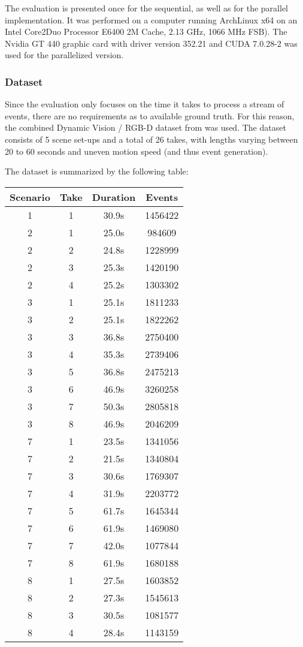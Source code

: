 The evaluation is presented once for the sequential, as well as for the parallel implementation.
It was performed on a computer running ArchLinux x64 on an Intel Core2Duo Processor E6400 2M Cache, 2.13 GHz, 1066 MHz FSB).
The Nvidia GT 440 graphic card with driver version 352.21 and CUDA 7.0.28-2 was used for the parallelized version.

\subsubsection{Dataset}
Since the evaluation only focuses on the time it takes to process a stream of events, there are no requirements as to available ground truth.
For this reason, the combined Dynamic Vision / RGB-D dataset from \cite{ebslamdataset} was used.
The dataset consists of 5 scene set-ups and a total of 26 takes, with lengths varying between 20 to 60 seconds and uneven motion speed (and thus event generation).

The dataset is summarized by the following table:\\
\begin{center}
\begin{tabular}{ | c | c | c | c | }
	\hline		
	Scenario & Take & Duration & Events\\
	\hline	
	\hline	
	1 & 1 & 30.9s & 1456422\\
	2 & 1 & 25.0s & 984609\\
	2 & 2 & 24.8s & 1228999\\
	2 & 3 & 25.3s & 1420190\\
	2 & 4 & 25.2s & 1303302\\
	3 & 1 & 25.1s & 1811233\\
	3 & 2 & 25.1s & 1822262\\
	3 & 3 & 36.8s & 2750400\\
	3 & 4 & 35.3s & 2739406\\
	3 & 5 & 36.8s & 2475213\\
	3 & 6 & 46.9s & 3260258\\
	3 & 7 & 50.3s & 2805818\\
	3 & 8 & 46.9s & 2046209\\
	7 & 1 & 23.5s & 1341056\\
	7 & 2 & 21.5s & 1340804\\
	7 & 3 & 30.6s & 1769307\\
	7 & 4 & 31.9s & 2203772\\
	7 & 5 & 61.7s & 1645344\\
	7 & 6 & 61.9s & 1469080\\
	7 & 7 & 42.0s & 1077844\\
	7 & 8 & 61.9s & 1680188\\
	8 & 1 & 27.5s & 1603852\\
	8 & 2 & 27.3s & 1545613\\
	8 & 3 & 30.5s & 1081577\\
	8 & 4 & 28.4s & 1143159\\                     
	\hline			
\end{tabular}
\end{center}


